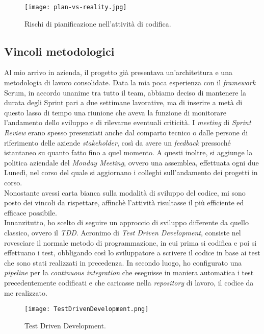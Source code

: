 \begin{figure}[h]
\texttt{[image: plan-vs-reality.jpg]}
\centering
\caption{Rischi di pianificazione nell'attività di codifica.} 
\label{fig:plan-vs-reality}
\end{figure}

\subsection{Vincoli metodologici}
Al mio arrivo in azienda, il progetto già presentava un'architettura e una metodologia di lavoro consolidate.
Data la mia poca esperienza con il \textit{framework} Scrum, in accordo unanime tra tutto il team, abbiamo deciso di mantenere la durata degli Sprint pari a due settimane lavorative, ma di inserire a metà di questo lasso di tempo una riunione che aveva la funzione di monitorare l'andamento dello sviluppo e di rilevarne eventuali criticità. I \textit{meeting} di \textit{Sprint Review} erano spesso presenziati anche dal comparto tecnico o dalle persone di riferimento delle aziende \textit{stakeholder}, così da avere un \textit{feedback} pressoché istantaneo su quanto fatto fino a quel momento.
A questi inoltre, si aggiunge la politica aziendale del \textit{Monday Meeting}, ovvero una assemblea, effettuata ogni due Lunedì, nel corso del quale si aggiornano i colleghi sull'andamento dei progetti in corso.\\
Nonostante avessi carta bianca sulla modalità di sviluppo del codice, mi sono posto dei vincoli da rispettare, affinchè l'attività risultasse il più efficiente ed efficace possibile.\\
Innanzitutto, ho scelto di seguire un approccio di sviluppo differente da quello classico, ovvero il \textit{TDD}. Acronimo di \textit{Test Driven Development}, consiste nel rovesciare il normale metodo di programmazione, in cui prima si codifica e poi si effettuano i test, obbligando così lo sviluppatore a scrivere il codice in base ai test che sono stati realizzati in precedenza.
In secondo luogo, ho configurato una \textit{pipeline} per la \textit{continuous integration} che eseguisse in maniera automatica i test precedentemente codificati e che caricasse nella \textit{repository} di lavoro, il codice da me realizzato.
\begin{figure}[h]
\texttt{[image: TestDrivenDevelopment.png]}
\centering
\caption{Test Driven Development.} 
\label{fig:tdd}
\end{figure}
